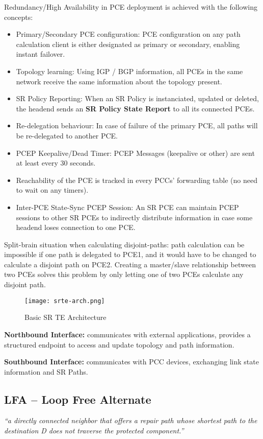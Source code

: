 Redundancy/High Availability in PCE deployment is achieved with the following concepts:
\begin{itemize}
    \item Primary/Secondary PCE configuration: PCE configuration on any path calculation client is either designated as primary or secondary, enabling instant failover. 
    \item Topology learning: Using IGP / BGP information, all PCEs in the same network receive the same information about the topology present.
    \item SR Policy Reporting: When an SR Policy is instanciated, updated or deleted, the headend sends an \textbf{SR Policy State Report }to all its connected PCEs.
    \item Re-delegation behaviour: In case of failure of the primary PCE, all paths will be re-delegated to another PCE.   
    \item PCEP Keepalive/Dead Timer: PCEP Messages (keepalive or other) are sent at least every 30 seconds.
    \item Reachability of the PCE is tracked in every PCCs' forwarding table (no need to wait on any timers). 
    \item Inter-PCE State-Sync PCEP Session: An SR PCE can maintain PCEP sessions to other SR PCEs to indirectly distribute information in case some headend loses connection to one PCE. 
\end{itemize}

Split-brain situation when calculating disjoint-paths: path calculation can be impossible if one path is delegated to PCE1, and it
would have to be changed to calculate a disjoint path on PCE2. Creating a master/slave relationship between two PCEs solves this problem by only letting one 
of two PCEs calculate any disjoint path. 

\begin{figure}[]
    \centering
    \texttt{[image: srte-arch.png]}
    \caption{Basic SR TE Architecture}
\end{figure}

\textbf{Northbound Interface:} communicates with external applications, provides a structured endpoint 
to access and update topology and path information.

\textbf{Southbound Interface:} communicates with PCC devices, exchanging link state information and SR Paths. 

\subsection{LFA -- Loop Free Alternate}
\emph{``a directly connected neighbor that offers a repair path whose shortest path to the destination D does not traverse the protected component.''}

